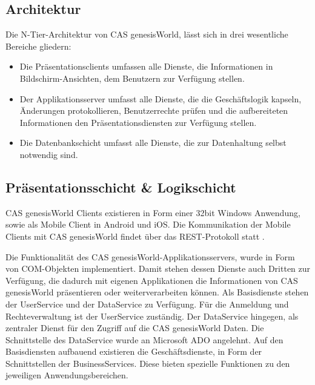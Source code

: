 \subsection{Architektur}

Die N-Tier-Architektur von CAS genesisWorld, lässt sich in drei wesentliche Bereiche gliedern:

\begin{itemize}
	\item Die Präsentationsclients umfassen alle Dienste, die Informationen in Bildschirm-Ansichten, dem Benutzern zur Verfügung stellen.
	\item Der Applikationsserver umfasst alle Dienste, die die Geschäftslogik kapseln, Änderungen protokollieren, Benutzerrechte prüfen und die aufbereiteten Informationen den Präsentationsdiensten zur Verfügung stellen.
	\item Die Datenbankschicht umfasst alle Dienste, die zur Datenhaltung selbst notwendig sind.
\end{itemize}


\subsection{Präsentationsschicht \& Logikschicht}

CAS genesisWorld Clients existieren in Form einer 32bit Windows Anwendung, sowie als Mobile Client in Android und iOS. Die Kommunikation der Mobile Clients mit CAS genesisWorld findet über das REST-Protokoll statt \cite{cas2013a}.

Die Funktionalität des CAS genesisWorld-Applikationsservers, wurde in Form von COM-Objekten implementiert. Damit stehen dessen Dienste auch Dritten zur Verfügung, die dadurch mit eigenen Applikationen die Informationen von CAS genesisWorld präsentieren oder weiterverarbeiten können. Als Basisdienste stehen der UserService und der DataService zu Verfügung. Für die Anmeldung und Rechteverwaltung ist der UserService zuständig. Der DataService hingegen, als zentraler Dienst für den Zugriff auf die CAS genesisWorld Daten. Die Schnittstelle des DataService wurde an Microsoft ADO angelehnt. Auf den Basisdiensten aufbauend existieren die Geschäftsdienste, in Form der Schnittstellen der BusinessServices. Diese bieten spezielle Funktionen zu den jeweiligen Anwendungsbereichen.

